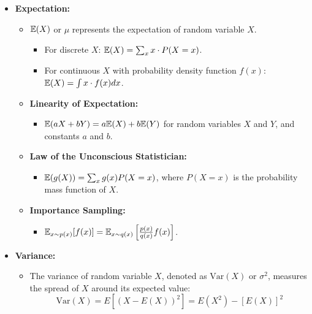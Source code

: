 \documentclass{article}
\begin{document}
\begin{itemize}
  \item \textbf{Expectation:}
  \begin{itemize}
    \item ${\mathbb E}(X)$ or $\mu$ represents the expectation of random variable $X$.
    \begin{itemize}
      \item For discrete $X$: ${\mathbb E}(X) = \sum_{x} x \cdot P(X = x)$.
      \item For continuous $X$ with probability density function $f(x)$: ${\mathbb E}(X) = \int x \cdot f(x) dx$.
    \end{itemize}
    \item \textbf{Linearity of Expectation:}
    \begin{itemize}
      \item ${\mathbb E}(aX + bY) = a{\mathbb E}(X) + b{\mathbb E}(Y)$ for random variables $X$ and $Y$, and constants $a$ and $b$.
    \end{itemize}
    \item \textbf{Law of the Unconscious Statistician:}
    \begin{itemize}
      \item ${\mathbb E}(g(X)) = \sum_{x} g(x)P(X=x)$, where $P(X=x)$ is the probability mass function of $X$.
    \end{itemize}
    \item \textbf{Importance Sampling:}
    \begin{itemize}
      \item ${\mathbb E}_{x\sim p(x)}[f(x)] = {\mathbb E}_{x\sim q(x)}\left[\frac{p(x)}{q(x)}f(x)\right]$.
      
    \end{itemize}
    
  \end{itemize}

  \item \textbf{Variance:}
    \begin{itemize}
    \item The variance of random variable $X$, denoted as $\text{Var}(X)$ or $\sigma^2$, measures the spread of $X$ around its expected value:
    \[
    \text{Var}(X) = E[(X - E(X))^2] = E(X^2) - [E(X)]^2
    \]    


\end{itemize}
\end{itemize}
\end{document}
